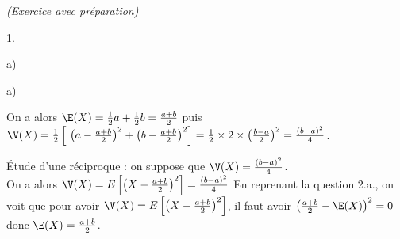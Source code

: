 \documentclass[11pt]{article}%
\begin{document}
\begin{exercice}{\it (Exercice avec préparation)}
\begin{noliste}{1.}
\begin{noliste}{a)}
 \end{noliste}
 \item 
 \begin{noliste}{a)}
 \setlength{\itemsep}{2mm} 
 \item On a alors $ \E(X) = \frac{1}{2} a + \frac{1}{2} b = \frac{a +
b}{2}$ puis $\V(X) = \frac{1}{2} \left[ \ \left( a - \frac{a + b}{2}
\right)^{2} + \left( b - \frac{a + b}{2} \right)^{2} \right] =
\frac{1}{2} \times 2 \times \left( \frac{b-a}{2} \right)^{2} = \frac{
(b-a)^{2}}{4}$. \\
 \item Étude d'une réciproque : on suppose que $\V(X) =
\frac{(b-a)^{2}}{4}$. \\
 On a alors $\V(X) = E \left[ \left( X - \frac{a + b}{2} \right)^{2}
\right] = \frac{ (b-a)^{2}}{4} $
 En reprenant la question 2.a., on voit que pour avoir $\V(X) = E
\left[ \left( X - \frac{a + b}{2} \right)^{2} \right] $, il faut avoir
$\left( \frac{a + b}{2} - \E(X) \right)^{2} = 0$ donc $\E(X) = \frac{a
+ b}{2}$. \\


\end{noliste}
\end{noliste}
\end{exercice}
\end{document}
